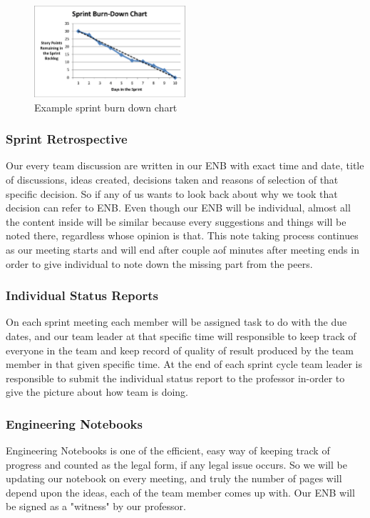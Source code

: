                    \begin{figure}[!h]
                        \centering
                        \includegraphics[width=0.5\textwidth]{images/burn}
                        \caption{Example sprint burn down chart \cite{Anon2019}}
                    \end{figure}
                   

\subsubsection{Sprint Retrospective}
Our every team discussion are written in our ENB with exact time and date, title of discussions, ideas created, decisions taken and reasons of selection of that specific decision. So if any of us wants to look back about why we took that decision can refer to ENB. Even though our ENB will be individual, almost all the content inside will be similar because every suggestions and things will be noted there, regardless whose opinion is that. This note taking process continues as our meeting starts and will end after couple aof minutes after meeting ends in order to give individual to note down the missing part from the peers. 


\subsubsection{Individual Status Reports}
On each sprint meeting each member will be assigned task to do with the due dates, and our team leader at that specific time will responsible to keep track of everyone in the team and keep record of quality of result produced by the team member in that given specific time. At the end of each sprint cycle team leader is responsible to submit the individual status report to the professor in-order to give the picture about how team is doing.


\subsubsection{Engineering Notebooks}
Engineering Notebooks is one of the efficient, easy way of keeping track of progress and counted as the legal form, if any legal issue occurs. So we will be updating our notebook on every meeting, and truly the number of pages will depend upon the ideas, each of the team member comes up with. Our ENB will be signed as a "witness" by our professor.   


